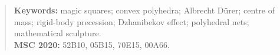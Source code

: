 \begin{abstract}
\smallskip\noindent\textbf{Keywords:} magic squares; convex polyhedra; Albrecht D\"urer; centre of mass; rigid-body precession; Dzhanibekov effect; polyhedral nets; mathematical sculpture.\\
\noindent\textbf{MSC 2020:} 52B10, 05B15, 70E15, 00A66.
\end{abstract}
